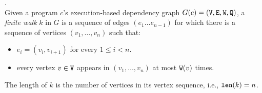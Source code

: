 
\begin{defn}.
  \label{def:finitewalk}
  \\
  Given a program $c$'s execution-based dependency graph $G(c) = (\mathtt{V}, \mathtt{E}, \mathtt{W}, \mathtt{Q})$, 
  a \emph{finite walk} $k$ in $G$ is a sequence of edges $(e_1 \ldots e_{n - 1})$ 
  for which there is a sequence of vertices $(v_1, \ldots, v_{n})$ such that:
  \begin{itemize}
      \item $e_i = (v_{i},v_{i + 1})$ for every $1 \leq i < n$.
      \item every vertex $v \in \mathtt{V}$ appears in $(v_1, \ldots, v_{n})$ at most 
      $\mathtt{W}(v)$ times.  
  \end{itemize}
  The length of $k$ is the number of vertices in its vertex sequence, i.e., $\mathtt{len}(k) = n$.
  \end{defn}
